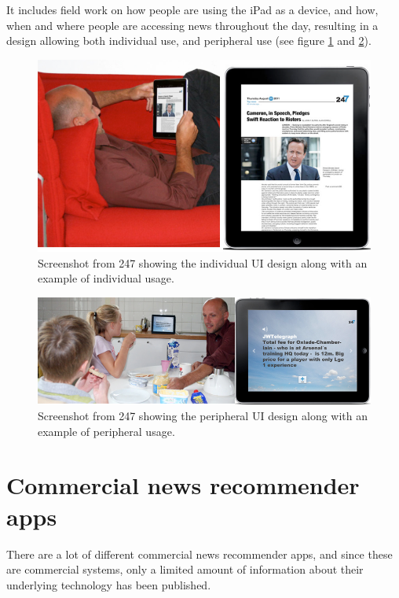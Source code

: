 It includes field work on how people are using the iPad as a device, and how, when and where people are accessing news throughout the day, resulting in a design allowing both individual use, and peripheral use (see figure \ref{future_of_news_individual_use} and \ref{future_of_news_peripheral_use}).

\begin{figure}[!htbp]
\centering
\includegraphics[width=120mm]{GFX/screenshots/futureOfNewsPaperIndividualUse.png}
\caption{Screenshot from 247 showing the individual UI design along with an example of individual usage.}
\label{future_of_news_individual_use}
\end{figure}

\begin{figure}[!htbp]
\centering
\includegraphics[width=120mm]{GFX/screenshots/futureOfNewsPaperPeripheralUse.png}
\caption{Screenshot from 247 showing the peripheral UI design along with an example of peripheral usage.}
\label{future_of_news_peripheral_use}
\end{figure}

\section{Commercial news recommender apps}
\label{commercial_news_applications}
There are a lot of different commercial news recommender apps, and since these are commercial systems, only a limited amount of information about their underlying technology has been published.

